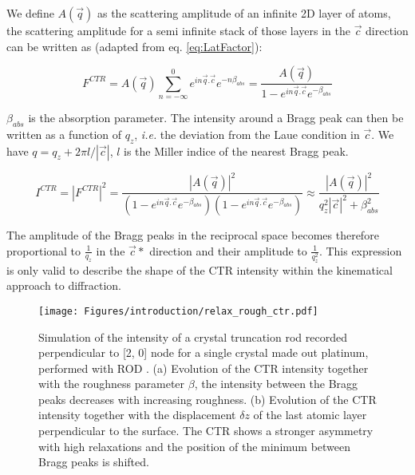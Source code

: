 We define $A(\vec{q})$ as the scattering amplitude of an infinite 2D layer of atoms, the scattering amplitude for a semi infinite stack of those layers in the $\vec{c}$ direction can be written as (adapted from eq. \ref{eq:LatFactor}):

\begin{equation}
    \label{eq:CTR1}
    F^{CTR} = A(\vec{q})\sum_{n=-\infty}^0 e^{in\vec{q}.\vec{c}} e^{-n\beta_{abs}} = \frac{A(\vec{q})}{1 - e^{in\vec{q}.\vec{c}} e^{-\beta_{abs}}}
\end{equation}

$\beta_{abs}$ is the absorption parameter.
The intensity around a Bragg peak can then be written as a function of $q_z$, \textit{i.e.} the deviation from the Laue condition in $\vec{c}$. We have $q = q_z + 2\pi l/|\vec{c}|$, $l$ is the Miller indice of the nearest Bragg peak.

\begin{equation}
    \label{eq:CTR2}
    I^{CTR} = |F^{CTR}|^2 = \frac{|A(\vec{q})|^2}{(1 - e^{in\vec{q}.\vec{c}} e^{-\beta_{abs}})(1 - e^{in\vec{q}.\vec{c}} e^{-\beta_{abs}})} \approx \frac{|A(\vec{q})|^2}{q_z^2 |\vec{c}|^2 + \beta_{abs}^2 }
\end{equation}

The amplitude of the Bragg peaks in the reciprocal space becomes therefore proportional to $\frac{1}{q_z}$ in the $\vec{c}*$ direction and their amplitude to $\frac{1}{q_z^2}$.
This expression is only valid to describe the shape of the CTR intensity within the kinematical approach to diffraction.

\begin{figure}[!htb]
    \centering
    \texttt{[image: Figures/introduction/relax\_rough\_ctr.pdf]}
    \caption{
    Simulation of the intensity of a crystal truncation rod recorded perpendicular to [2, 0] node for a single crystal made out platinum, performed with ROD \parencite{Vlieg2000}.
    (a) Evolution of the CTR intensity together with the roughness parameter $\beta$, the intensity between the Bragg peaks decreases with increasing roughness.
    (b) Evolution of the CTR intensity together with the displacement $\delta z$ of the last atomic layer perpendicular to the surface.
    The CTR shows a stronger asymmetry with high relaxations and the position of the minimum between Bragg peaks is shifted.
    }
    \label{fig:CTRSimulation}
\end{figure}

